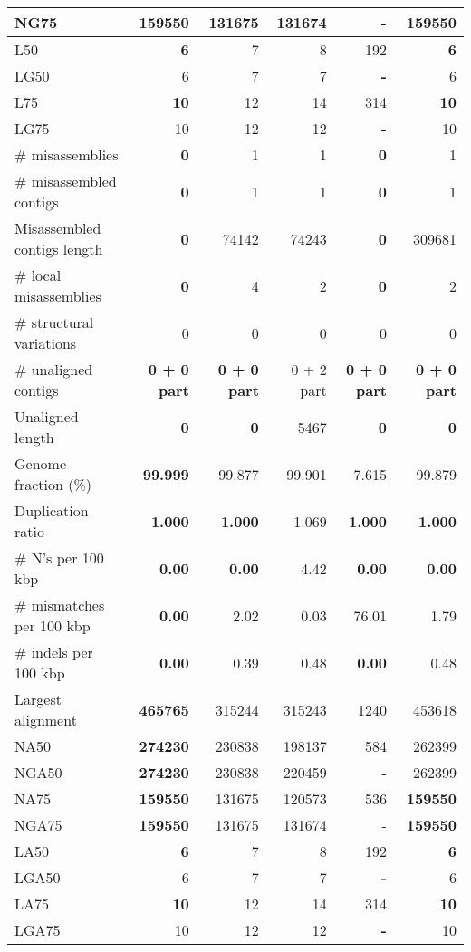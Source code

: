 \documentclass[12pt,a4paper]{article}
\begin{document}
\begin{table}[ht]
\begin{center}
\begin{tabular}{|l*{5}{|r}|}
NG75 & {\bf 159550} & 131675 & 131674 & - & {\bf 159550} \\ \hline
L50 & {\bf 6} & 7 & 8 & 192 & {\bf 6} \\ \hline
LG50 & 6 & 7 & 7 & {\bf -} & 6 \\ \hline
L75 & {\bf 10} & 12 & 14 & 314 & {\bf 10} \\ \hline
LG75 & 10 & 12 & 12 & {\bf -} & 10 \\ \hline
\# misassemblies & {\bf 0} & 1 & 1 & {\bf 0} & 1 \\ \hline
\# misassembled contigs & {\bf 0} & 1 & 1 & {\bf 0} & 1 \\ \hline
Misassembled contigs length & {\bf 0} & 74142 & 74243 & {\bf 0} & 309681 \\ \hline
\# local misassemblies & {\bf 0} & 4 & 2 & {\bf 0} & 2 \\ \hline
\# structural variations & 0 & 0 & 0 & 0 & 0 \\ \hline
\# unaligned contigs & {\bf 0 + 0 part} & {\bf 0 + 0 part} & 0 + 2 part & {\bf 0 + 0 part} & {\bf 0 + 0 part} \\ \hline
Unaligned length & {\bf 0} & {\bf 0} & 5467 & {\bf 0} & {\bf 0} \\ \hline
Genome fraction (\%) & {\bf 99.999} & 99.877 & 99.901 & 7.615 & 99.879 \\ \hline
Duplication ratio & {\bf 1.000} & {\bf 1.000} & 1.069 & {\bf 1.000} & {\bf 1.000} \\ \hline
\# N's per 100 kbp & {\bf 0.00} & {\bf 0.00} & 4.42 & {\bf 0.00} & {\bf 0.00} \\ \hline
\# mismatches per 100 kbp & {\bf 0.00} & 2.02 & 0.03 & 76.01 & 1.79 \\ \hline
\# indels per 100 kbp & {\bf 0.00} & 0.39 & 0.48 & {\bf 0.00} & 0.48 \\ \hline
Largest alignment & {\bf 465765} & 315244 & 315243 & 1240 & 453618 \\ \hline
NA50 & {\bf 274230} & 230838 & 198137 & 584 & 262399 \\ \hline
NGA50 & {\bf 274230} & 230838 & 220459 & - & 262399 \\ \hline
NA75 & {\bf 159550} & 131675 & 120573 & 536 & {\bf 159550} \\ \hline
NGA75 & {\bf 159550} & 131675 & 131674 & - & {\bf 159550} \\ \hline
LA50 & {\bf 6} & 7 & 8 & 192 & {\bf 6} \\ \hline
LGA50 & 6 & 7 & 7 & {\bf -} & 6 \\ \hline
LA75 & {\bf 10} & 12 & 14 & 314 & {\bf 10} \\ \hline
LGA75 & 10 & 12 & 12 & {\bf -} & 10 \\ \hline
\end{tabular}
\end{center}
\end{table}
\end{document}
